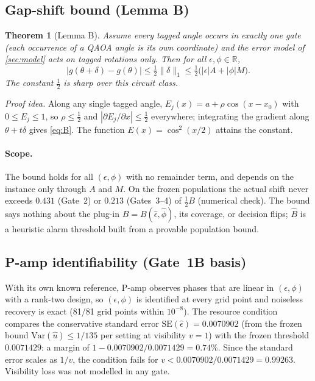 \documentclass[10pt,twocolumn]{article}
\newtheorem{theorem}{Theorem}
\theoremstyle{definition}
\theoremstyle{remark}
\newcommand{\R}{\mathbb{R}}
\newcommand{\eps}{\epsilon}
\begin{document}
\subsection{Gap-shift bound (Lemma B)}

\begin{theorem}[Lemma B]\label{thm:B}
Assume every tagged angle occurs in exactly one gate (each occurrence of a QAOA angle is its own coordinate) and the error model of \cref{sec:model} acts on tagged rotations only. Then for all $\eps,\phi\in\R$,
\begin{equation}\label{eq:B}
|g(\theta+\delta)-g(\theta)|\le\tfrac12\|\delta\|_1\le\tfrac12\bigl(|\eps|A+|\phi|M\bigr).
\end{equation}
The constant $\tfrac12$ is sharp over this circuit class.
\end{theorem}
\noindent\emph{Proof idea.} Along any single tagged angle, $E_j(x)=a+\rho\cos(x-x_0)$ with $0\le E_j\le1$, so $\rho\le\tfrac12$ and $|\partial E_j/\partial x|\le\tfrac12$ everywhere; integrating the gradient along $\theta+t\delta$ gives \eqref{eq:B}. The function $E(x)=\cos^2(x/2)$ attains the constant.

\paragraph{Scope.} The bound holds for all $(\eps,\phi)$ with no remainder term, and depends on the instance only through $A$ and $M$. On the frozen populations the actual shift never exceeds $0.431$ (Gate~2) or $0.213$ (Gates~3--4) of $\tfrac12B$ (numerical check). The bound says nothing about the plug-in $\hat B=B(\hat\eps,\hat\phi)$, its coverage, or decision flips; $\hat B$ is a heuristic alarm threshold built from a provable population bound.

\subsection{P-amp identifiability (Gate~1B basis)}
With its own known reference, P-amp observes phases that are linear in $(\eps,\phi)$ with a rank-two design, so $(\eps,\phi)$ is identified at every grid point and noiseless recovery is exact (81/81 grid points within $10^{-8}$). The resource condition compares the conservative standard error $\mathrm{SE}(\hat\eps)=0.0070902$ (from the frozen bound $\mathrm{Var}(\hat u)\le1/135$ per setting at visibility $v=1$) with the frozen threshold $0.0071429$: a margin of $1-0.0070902/0.0071429=0.74\%$. Since the standard error scales as $1/v$, the condition fails for $v<0.0070902/0.0071429=0.99263$. Visibility loss was not modelled in any gate.
\end{document}
